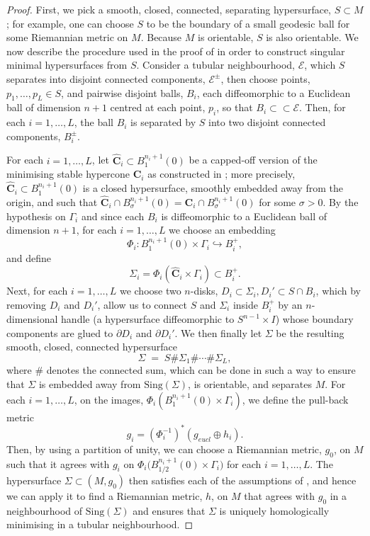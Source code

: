 \documentclass[12pt]{article}
\begin{document}
\begin{proof}
First, we pick a smooth, closed, connected, separating hypersurface, $S\subset M$; for example, one can choose $S$ to be the boundary of a small geodesic ball for some Riemannian metric on $M$. Because $M$ is orientable, $S$ is also orientable. We now describe the procedure used in the proof of \cite[Theorem 1]{S00} in order to construct singular minimal hypersurfaces from $S$. Consider a tubular neighbourhood, $\mathcal{E}$, which $S$ separates into disjoint connected components, $\mathcal{E}^\pm$, then choose points, $p_1,\dots,p_L\in S$, and pairwise disjoint balls, $B_i$, each diffeomorphic to a Euclidean ball of dimension $n+1$ centred at each point, $p_i$, so that $B_i \subset \subset \mathcal{E}$. Then, for each $i = 1, \dots, L$, the ball $B_i$ is separated by $S$ into two disjoint connected components, $B_i^\pm$.

\bigskip
For each $i=1,\dots,L$, let $ \mathbf{\widehat C}_i\subset B^{n_i+1}_1(0)$ be a capped-off version of the minimising stable hypercone $\mathbf{C}_i$ as constructed in \cite[Section 2, Proposition]{S00}; more precisely, $\mathbf{\widehat C}_i\subset B^{n_i+1}_1(0)$ is a closed hypersurface, smoothly embedded away from the origin, and such that $\mathbf{\widehat C}_i \cap B^{n_i+1}_\sigma(0) = \mathbf{C}_i \cap B^{n_i+1}_\sigma(0)$ for some $\sigma > 0$. By the hypothesis on $\Gamma_i$ and since each $B_i$ is diffeomorphic to a Euclidean ball of dimension $n+1$, for each $i = 1,\dots,L$ we choose an embedding
\[
\Phi_i: B^{n_i+1}_1(0)\times \Gamma_i \hookrightarrow B_i^+,
\]
and define
\[
\Sigma_i = \Phi_i(\mathbf{\widehat  C}_i\times \Gamma_i)\subset B_i^+ .
\]
Next, for each $i = 1,\dots,L$ we choose two $n$-disks, $D_i \subset \Sigma_i,D_i'\subset S\cap B_i$, which by removing $D_i$ and $D_i'$, allow us to connect $S$ and $\Sigma_i$ inside $B_i^+$ by an $n$-dimensional handle (a hypersurface diffeomorphic to $S^{n-1}\times I$) whose boundary components are glued to $\partial D_i$ and $\partial D_i'$.
We then finally let $\Sigma$ be the resulting smooth, closed, connected hypersurface
\[
\Sigma \;=\; S \# \Sigma_1 \# \cdots \# \Sigma_L,
\]
where $\#$ denotes the connected sum, which can be done in such a way to ensure that $\Sigma$ is embedded away from $\mathrm{Sing}(\Sigma)$, is orientable, and separates $M$. For each $i= 1,\dots, L$, on the images, $\Phi_i(B^{n_i+1}_1(0)\times \Gamma_i)$, we define the pull-back metric
\[
g_i = (\Phi_i^{-1})^*(g_{eucl}\oplus h_i).
\]
Then, by using a partition of unity, we can choose a Riemannian metric, $g_0$, on $M$ such that it agrees with $g_i$ on $\Phi_i\bigl(B^{n_i+1}_{1/2}(0) \times \Gamma_i\bigr)$ for each $i=1,\dots,L$.
The hypersurface $\Sigma \subset (M,g_0)$ then satisfies each of the assumptions of \cite[Lemma 1]{S00}, and hence we can apply it to find a Riemannian metric, $h$, on $M$
that agrees with $g_0$ in a neighbourhood of $\mathrm{Sing}(\Sigma)$ and ensures that $\Sigma$ is uniquely homologically minimising in a tubular neighbourhood. 


\end{proof}
\end{document}
